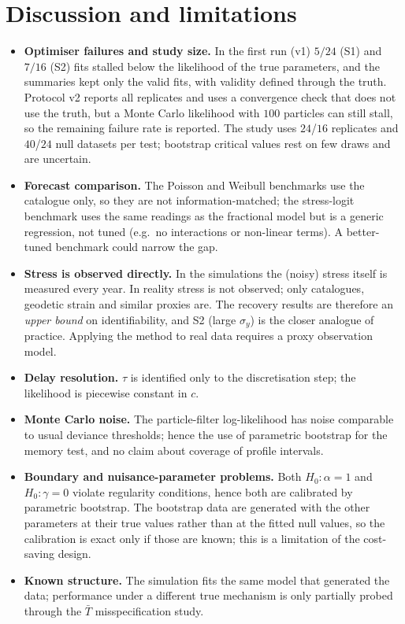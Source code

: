 \documentclass[11pt,a4paper]{article}
\newcommand{\Tb}{\bar T}
\begin{document}
\section{Discussion and limitations}
\begin{itemize}
\item \textbf{Optimiser failures and study size.} In the first run (v1) $5/24$ (S1) and $7/16$ (S2) fits stalled below the likelihood of the true parameters, and the summaries kept only the valid fits, with validity defined through the truth. Protocol v2 reports all replicates and uses a convergence check that does not use the truth, but a Monte Carlo likelihood with $100$ particles can still stall, so the remaining failure rate is reported. The study uses $24$/$16$ replicates and $40$/$24$ null datasets per test; bootstrap critical values rest on few draws and are uncertain.
\item \textbf{Forecast comparison.} The Poisson and Weibull benchmarks use the catalogue only, so they are not information-matched; the stress-logit benchmark uses the same readings as the fractional model but is a generic regression, not tuned (e.g.\ no interactions or non-linear terms). A better-tuned benchmark could narrow the gap.
\item \textbf{Stress is observed directly.} In the simulations the (noisy) stress itself is measured every year. In reality stress is not observed; only catalogues, geodetic strain and similar proxies are. The recovery results are therefore an \emph{upper bound} on identifiability, and S2 (large $\sigma_y$) is the closer analogue of practice. Applying the method to real data requires a proxy observation model.
\item \textbf{Delay resolution.} $\tau$ is identified only to the discretisation step; the likelihood is piecewise constant in $c$.
\item \textbf{Monte Carlo noise.} The particle-filter log-likelihood has noise comparable to usual deviance thresholds; hence the use of parametric bootstrap for the memory test, and no claim about coverage of profile intervals.
\item \textbf{Boundary and nuisance-parameter problems.} Both $H_0:\alpha=1$ and $H_0:\gamma=0$ violate regularity conditions, hence both are calibrated by parametric bootstrap. The bootstrap data are generated with the other parameters at their true values rather than at the fitted null values, so the calibration is exact only if those are known; this is a limitation of the cost-saving design.
\item \textbf{Known structure.} The simulation fits the same model that generated the data; performance under a different true mechanism is only partially probed through the $\Tb$ misspecification study.

\end{itemize}
\end{document}
